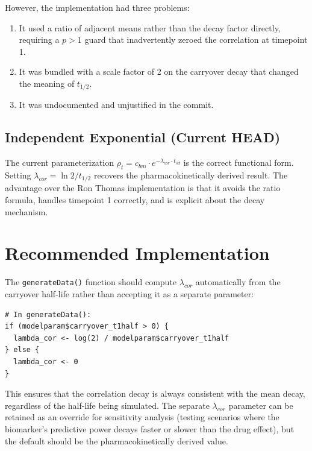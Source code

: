 \documentclass[11pt]{article}
\begin{document}
However, the implementation had three problems:

\begin{enumerate}
\item It used a ratio of adjacent means rather than the
  decay factor directly, requiring a $p > 1$ guard that
  inadvertently zeroed the correlation at timepoint 1.
\item It was bundled with a scale factor of 2 on the
  carryover decay that changed the meaning of
  $t_{1/2}$.
\item It was undocumented and unjustified in the commit.
\end{enumerate}

\subsection{Independent Exponential (Current HEAD)}

The current parameterization $\rho_t = c_{bm} \cdot
e^{-\lambda_{cor} \cdot t_{sd}}$ is the correct functional
form. Setting $\lambda_{cor} = \ln 2 / t_{1/2}$ recovers
the pharmacokinetically derived result. The advantage over
the Ron Thomas implementation is that it avoids the ratio
formula, handles timepoint 1 correctly, and is explicit
about the decay mechanism.

\section{Recommended Implementation}

The \texttt{generateData()} function should compute
$\lambda_{cor}$ automatically from the carryover half-life
rather than accepting it as a separate parameter:

\begin{verbatim}
# In generateData():
if (modelparam$carryover_t1half > 0) {
  lambda_cor <- log(2) / modelparam$carryover_t1half
} else {
  lambda_cor <- 0
}
\end{verbatim}

This ensures that the correlation decay is always consistent
with the mean decay, regardless of the half-life being
simulated. The separate $\lambda_{cor}$ parameter can be
retained as an override for sensitivity analysis (testing
scenarios where the biomarker's predictive power decays
faster or slower than the drug effect), but the default
should be the pharmacokinetically derived value.
\end{document}

